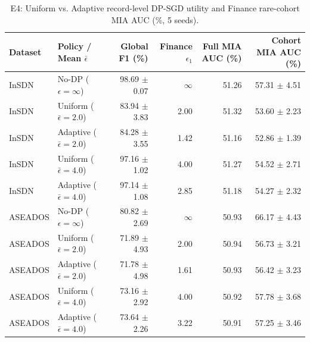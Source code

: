 \begin{table}[t]
\centering
\caption{E4: Uniform vs. Adaptive record-level DP-SGD utility and Finance rare-cohort MIA AUC (\%, 5 seeds).}
\label{tab:e4_dp_mia}
\begin{tabular}{llrrrr}
\toprule
Dataset & Policy / Mean $\bar{\epsilon}$ & Global F1 (\%) & Finance $\epsilon_1$ & Full MIA AUC (\%) & Cohort MIA AUC (\%) \\
\midrule
InSDN & No-DP ($\epsilon=\infty$) & 98.69 $\pm$ 0.07 & $\infty$ & 51.26 & 57.31 $\pm$ 4.51 \\
InSDN & Uniform ($\bar{\epsilon}=2.0$) & 83.94 $\pm$ 3.83 & 2.00 & 51.32 & 53.60 $\pm$ 2.23 \\
InSDN & Adaptive ($\bar{\epsilon}=2.0$) & 84.28 $\pm$ 3.55 & 1.42 & 51.16 & 52.86 $\pm$ 1.39 \\
InSDN & Uniform ($\bar{\epsilon}=4.0$) & 97.16 $\pm$ 1.02 & 4.00 & 51.27 & 54.52 $\pm$ 2.71 \\
InSDN & Adaptive ($\bar{\epsilon}=4.0$) & 97.14 $\pm$ 1.08 & 2.85 & 51.18 & 54.27 $\pm$ 2.32 \\
\midrule
ASEADOS & No-DP ($\epsilon=\infty$) & 80.82 $\pm$ 2.69 & $\infty$ & 50.93 & 66.17 $\pm$ 4.43 \\
ASEADOS & Uniform ($\bar{\epsilon}=2.0$) & 71.89 $\pm$ 4.93 & 2.00 & 50.94 & 56.73 $\pm$ 3.21 \\
ASEADOS & Adaptive ($\bar{\epsilon}=2.0$) & 71.78 $\pm$ 4.98 & 1.61 & 50.93 & 56.42 $\pm$ 3.23 \\
ASEADOS & Uniform ($\bar{\epsilon}=4.0$) & 73.16 $\pm$ 2.92 & 4.00 & 50.92 & 57.78 $\pm$ 3.68 \\
ASEADOS & Adaptive ($\bar{\epsilon}=4.0$) & 73.64 $\pm$ 2.26 & 3.22 & 50.91 & 57.25 $\pm$ 3.46 \\
\bottomrule
\end{tabular}
\end{table}
